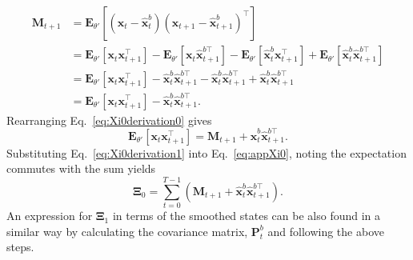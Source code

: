 \documentclass[review,authoryear,3p]{elsarticle}
\begin{document}
\begin{align}\label{eq:Xi0derivation0} 
 \mathbf M_{t+1}&=\mathbf E_{\theta'}\left[(\mathbf x_t-\mathbf{\hat x}_t^b)(\mathbf x_{t+1}-\mathbf{\hat x}_{t+1}^b)^\top\right] \nonumber \\
&=\mathbf E_{\theta'}\left[\mathbf x_t\mathbf x_{t+1}^\top\right]-\mathbf E_{\theta'}\left[\mathbf x_t\hat{\mathbf x}_{t+1}^{b\top}\right]-\mathbf E_{\theta'}\left[\hat{\mathbf x}_t^b\mathbf x_{t+1}^\top\right]+\mathbf E_{\theta'}\left[\hat{\mathbf x}_t^b\hat{\mathbf x}_{t+1}^{b\top}\right]  \nonumber \\
&= \mathbf E_{\theta'}\left[\mathbf x_t\mathbf x_{t+1}^\top\right]-\hat{\mathbf x}_t^b\hat{\mathbf x}_{t+1}^{b\top}-\hat{\mathbf x}_t^b\hat{\mathbf x}_{t+1}^{b\top}+\hat{\mathbf x}_t^b\hat{\mathbf x}_{t+1}^{b\top}\nonumber \\
&= \mathbf E_{\theta'}\left[\mathbf x_t\mathbf x_{t+1}^\top\right]-\hat{\mathbf x}_t^b\hat{\mathbf x}_{t+1}^{b\top}.
\end{align}
Rearranging   Eq.~\eqref{eq:Xi0derivation0} gives
\begin{equation}\label{eq:Xi0derivation1}
 \mathbf E_{\theta'}\left[\mathbf x_t\mathbf x_{t+1}^\top\right]=\mathbf M_{t+1}+\mathbf {\hat x}_t^b\mathbf{\hat x}_{t+1}^{b\top}.
\end{equation}
Substituting Eq.~\eqref{eq:Xi0derivation1} into Eq.~\eqref{eq:appXi0}, noting the expectation commutes with the sum yields
\begin{equation}
 \boldsymbol\Xi_0=\sum_{t=0}^{T-1}\left(\mathbf M_{t+1}+\mathbf{\hat x}_t^b\mathbf{\hat x}_{t+1}^{b\top}\right).
\end{equation}   
An expression for $\boldsymbol\Xi_1$ in terms of the smoothed states can be also found in a similar way by calculating the covariance matrix, $\mathbf P_t^b$ and following the above steps. 
\newpage
   
%  

\end{document}
